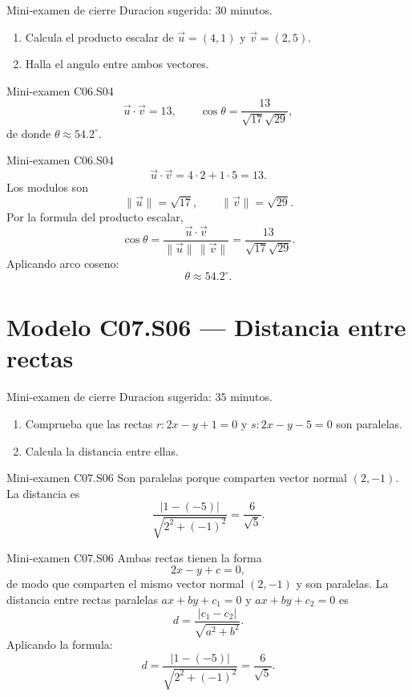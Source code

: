 \begin{exambrief}{Mini-examen de cierre}
Duracion sugerida: \(30\) minutos.
\begin{enumerate}
  \item Calcula el producto escalar de \(\vec u=(4,1)\) y \(\vec v=(2,5)\).
  \item Halla el angulo entre ambos vectores.
\end{enumerate}
\end{exambrief}

\begin{shortanswer}{Mini-examen C06.S04}
\[
\vec u\cdot \vec v=13,
\qquad
\cos\theta=\frac{13}{\sqrt{17}\sqrt{29}},
\]
de donde \(\theta\approx 54.2^\circ\).
\end{shortanswer}

\begin{fullsolution}{Mini-examen C06.S04}
\[
\vec u\cdot \vec v=4\cdot 2+1\cdot 5=13.
\]
Los modulos son
\[
\|\vec u\|=\sqrt{17},\qquad \|\vec v\|=\sqrt{29}.
\]
Por la formula del producto escalar,
\[
\cos\theta=\frac{\vec u\cdot \vec v}{\|\vec u\|\,\|\vec v\|}=
\frac{13}{\sqrt{17}\sqrt{29}}.
\]
Aplicando arco coseno:
\[
\theta\approx 54.2^\circ.
\]
\end{fullsolution}

\section{Modelo C07.S06 --- Distancia entre rectas}

\begin{exambrief}{Mini-examen de cierre}
Duracion sugerida: \(35\) minutos.
\begin{enumerate}
  \item Comprueba que las rectas \(r:2x-y+1=0\) y \(s:2x-y-5=0\) son paralelas.
  \item Calcula la distancia entre ellas.
\end{enumerate}
\end{exambrief}

\begin{shortanswer}{Mini-examen C07.S06}
Son paralelas porque comparten vector normal \((2,-1)\). La distancia es
\[
\frac{|1-(-5)|}{\sqrt{2^2+(-1)^2}}=\frac{6}{\sqrt{5}}.
\]
\end{shortanswer}

\begin{fullsolution}{Mini-examen C07.S06}
Ambas rectas tienen la forma
\[
2x-y+c=0,
\]
de modo que comparten el mismo vector normal \((2,-1)\) y son paralelas.
La distancia entre rectas paralelas \(ax+by+c_1=0\) y \(ax+by+c_2=0\) es
\[
d=\frac{|c_1-c_2|}{\sqrt{a^2+b^2}}.
\]
Aplicando la formula:
\[
d=\frac{|1-(-5)|}{\sqrt{2^2+(-1)^2}}=\frac{6}{\sqrt{5}}.
\]
\end{fullsolution}


